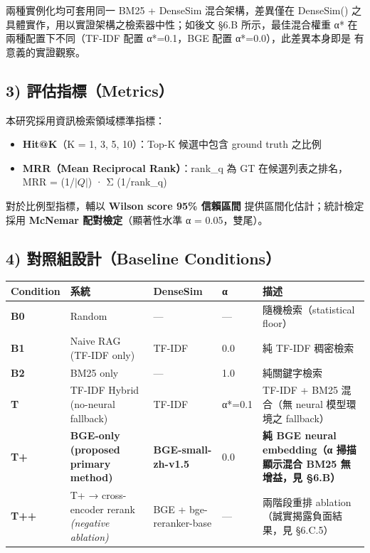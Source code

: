兩種實例化均可套用同一 BM25 + DenseSim 混合架構，差異僅在 DenseSim()
之具體實作，用以實證架構之檢索器中性；如後文 §6.B 所示，最佳混合權重 α*
在兩種配置下不同（TF-IDF 配置 α*=0.1，BGE 配置 α*=0.0），此差異本身即是
有意義的實證觀察。

\subsection{3) 評估指標（Metrics）}\label{ux8a55ux4f30ux6307ux6a19}

本研究採用資訊檢索領域標準指標：

\begin{itemize}
\tightlist
\item
  \textbf{Hit@K}（K = 1, 3, 5, 10）：Top-K 候選中包含 ground truth 之比例
\item
  \textbf{MRR（Mean Reciprocal Rank）}：rank\_q 為 GT 在候選列表之排名，MRR
  = (1/$|Q|$) · Σ (1/rank\_q)
\end{itemize}

對於比例型指標，輔以 \textbf{Wilson score 95\% 信賴區間}
提供區間化估計；統計檢定採用 \textbf{McNemar 配對檢定}（顯著性水準 α =
0.05，雙尾）。

\subsection{4) 對照組設計（Baseline Conditions）}\label{ux5c0dux7167ux7d44ux8a2dux8a08}

\begin{longtable}[]{@{}lllll@{}}
\toprule\noalign{}
Condition & 系統 & DenseSim & α & 描述 \\
\midrule\noalign{}
\endhead
\bottomrule\noalign{}
\endlastfoot
\textbf{B0} & Random & --- & --- & 隨機檢索（statistical floor） \\
\textbf{B1} & Naive RAG (TF-IDF only) & TF-IDF & 0.0 & 純 TF-IDF 稠密檢索 \\
\textbf{B2} & BM25 only & --- & 1.0 & 純關鍵字檢索 \\
\textbf{T} & TF-IDF Hybrid (no-neural fallback) & TF-IDF & α*=0.1 & TF-IDF + BM25 混合（無 neural 模型環境之 fallback） \\
\textbf{T+} & \textbf{BGE-only (proposed primary method)} & \textbf{BGE-small-zh-v1.5} & 0.0 & \textbf{純 BGE neural embedding（α 掃描顯示混合 BM25 無增益，見 §6.B）} \\
\textbf{T++} & T+ → cross-encoder rerank \emph{(negative ablation)} & BGE + bge-reranker-base & --- & 兩階段重排 ablation（誠實揭露負面結果，見 §6.C.5） \\
\end{longtable}

